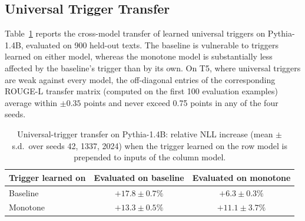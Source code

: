 \documentclass{article}
\theoremstyle{plain}
\theoremstyle{definition}
\theoremstyle{remark}
\begin{document}
\subsection{Universal Trigger Transfer}
\label{app:transfer}
Table~\ref{tab:uat-transfer} reports the cross-model transfer of learned universal triggers on Pythia-1.4B, evaluated on 900 held-out texts. The baseline is vulnerable to triggers learned on either model, whereas the monotone model is substantially less affected by the baseline's trigger than by its own. On T5, where universal triggers are weak against every model, the off-diagonal entries of the corresponding ROUGE-L transfer matrix (computed on the first 100 evaluation examples) average within $\pm 0.35$ points and never exceed 0.75 points in any of the four seeds.

\begin{table}[h]
\caption{Universal-trigger transfer on Pythia-1.4B: relative NLL increase (mean $\pm$ s.d.\ over seeds 42, 1337, 2024) when the trigger learned on the row model is prepended to inputs of the column model.}
\label{tab:uat-transfer}
\vskip 0.1in
\begin{center}
\begin{small}
\begin{tabular}{lcc}
\toprule
Trigger learned on & Evaluated on baseline & Evaluated on monotone \\
\midrule
Baseline & $+17.8 \pm 0.7\%$ & $+6.3 \pm 0.3\%$ \\
Monotone & $+13.3 \pm 0.5\%$ & $+11.1 \pm 3.7\%$ \\
\bottomrule
\end{tabular}
\end{small}
\end{center}
\vskip -0.1in
\end{table}
\end{document}
